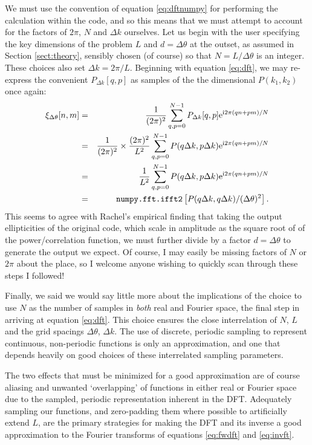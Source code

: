 \documentclass[preprint]{aastex}
\newcommand{\mi}{{\rm i}}
\newcommand{\me}{{\rm e}}
\begin{document}
We must use the convention of equation \eqref{eq:dftnumpy} for
performing the calculation within the code, and so this means that we
must attempt to account for the factors of $2 \pi$, $N$ and $\Delta
k$ ourselves.  Let us begin with the user specifying the
key dimensions of the problem $L$ and $d = \Delta \theta$ at the
outset, as assumed in Section \ref{sect:theory}, sensibly chosen (of
course) so that $N=L/\Delta \theta$ is an integer.  These choices also
set $\Delta k = 2 \pi / L$.  Beginning with equation
\eqref{eq:dft}, we may re-express the convenient $P_{\Delta k}[q, p]$ as
samples of the the dimensional $P(k_1, k_2)$ once again:
\begin{eqnarray}
\xi_{\Delta \theta}[n, m] & = & \frac{1}{( 2 \pi)^2}
\sum_{q,p=0}^{N-1} P_{\Delta k} [q, p] \me^{\mi 2 \pi (qn +
  pm) / N}  \\ & = & \frac{1}{(2 \pi)^2} \times \frac{(2 \pi)^2}{L^2}
 \sum_{q,p=0}^{N-1} P(q \Delta k, p \Delta k) \me^{\mi 2 \pi (qn +
  pm) / N} \\
& = & \frac{1}{L^2} \sum_{q,p=0}^{N-1} P(q \Delta k, p \Delta k) \me^{\mi 2 \pi (qn +
  pm) / N} \\
& = & \texttt{numpy.fft.ifft2}\left[P(q \Delta
  k, q \Delta k) / (\Delta \theta)^2\right].
\end{eqnarray}
This seems to agree with Rachel's empirical finding that taking the
output ellipticities of the original code, which scale in amplitude as the square root of
of the power/correlation function, we must further divide by a factor
$d = \Delta \theta$ to generate the output we expect.  Of course, I may
easily be missing factors of $N$ or $2 \pi $ about the place, so I
welcome anyone wishing to quickly scan through these steps I followed!

Finally, we said we would say little more about the implications of
the choice to use $N$ as the
number of samples in \emph{both} real and Fourier space, the final step in
arriving at equation \eqref{eq:dft}.  This choice ensures the
close interrelation of $N$, $L$ and the grid spacings $\Delta \theta$,
$\Delta k$.  The use of discrete, periodic sampling to represent
continuous, non-periodic functions is only an approximation, and
one that depends heavily on good choices of these interrelated sampling
parameters.

The two effects that must be minimized for a good approximation are of course
aliasing and unwanted
`overlapping' of functions in either real or Fourier space due to the
sampled, periodic
representation inherent in the DFT.  Adequately sampling our functions, and zero-padding
them where possible to artificially extend $L$, are the primary
strategies for making the DFT and its inverse a good approximation to
the Fourier transforms of equations \eqref{eq:fwdft} and
\eqref{eq:invft}.
\end{document}
